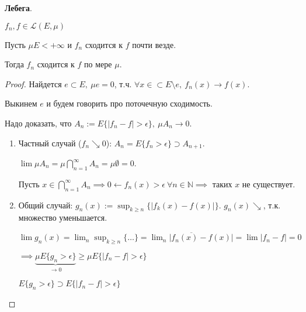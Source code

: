 \begin{theorem}
    \textbf{Лебега}.

    $f_n, f \in \mathscr{L}(E, \mu)$

    Пусть $\mu E < +\infty$ и $f_n$ сходится к $f$ почти везде.

    Тогда $f_n$ сходится к $f$ по мере $\mu$.
\end{theorem}
\begin{proof}
    Найдется $e \subset E, \ \mu e = 0$, т.ч. $\forall x \in \subset E \setminus e, \ f_n(x) \rightarrow f(x)$.

    Выкинем $e$ и будем говорить про поточечную сходимость.

    Надо доказать, что $A_n := E \{ |f_n - f| > \epsilon \}, \ \mu A_n \rightarrow 0$.

    \begin{enumerate}
        \item {
            Частный случай ($f_n \searrow 0$): $A_n = E \{ f_n > \epsilon \} \supset A_{n+1}$.

            $\lim{\mu A_n} = \mu \bigcap_{n=1}^{\infty} A_n = \mu \emptyset = 0$.
            
            Пусть $x \in \bigcap_{n=1}^{\infty} A_n \implies 0 \leftarrow f_n(x) > \epsilon \ \forall n \in \mathbb{N} \implies $ таких $x$ не существует.
        }
        \item {
            Общий случай: $g_n(x) := \sup_{k \geq n} \{ |f_k(x) - f(x)| \}$. $g_n(x) \searrow$, т.к. множество уменьшается.

            $\lim {g_n(x)} = \lim_{n} \sup_{k \geq n} \{ \dots \} = \overline{\lim_n {|f_n(x) - f(x)|}} = \lim {|f_n - f|} = 0$

            $\implies \underbrace{\mu E \{ g_n > \epsilon \}}_{\rightarrow 0} \geq \mu E \{ |f_n - f| > \epsilon \}$

            $E \{ g_n > \epsilon \} \supset E \{ |f_n - f| > \epsilon \}$
        }
    \end{enumerate}
\end{proof}


